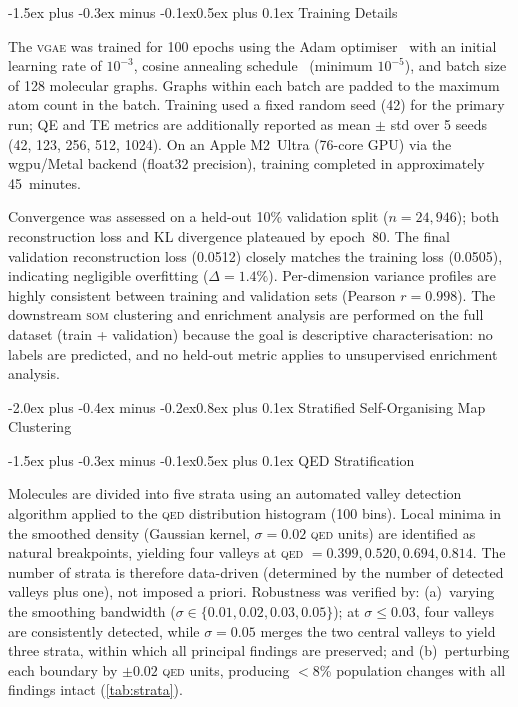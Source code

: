 \documentclass[10pt,a4paper,twocolumn]{article}
\makeatletter
\providecommand{\qed}{}
\let\qed\relax
\newcommand{\vgae}{\textsc{vgae}}
\newcommand{\som}{\textsc{som}}
\newcommand{\qedscore}{\textsc{qed}}
\let\qed\qedscore
\renewcommand\subsection{\@startsection{subsection}{2}{\z@}%
  {-2.0ex plus -0.4ex minus -0.2ex}{0.8ex plus 0.1ex}%
  {\normalfont\large\bfseries}}
\renewcommand\subsubsection{\@startsection{subsubsection}{3}{\z@}%
  {-1.5ex plus -0.3ex minus -0.1ex}{0.5ex plus 0.1ex}%
  {\normalfont\normalsize\bfseries}}
\makeatother
\begin{document}
\subsubsection{Training Details}

The \vgae{} was trained for 100 epochs using the Adam optimiser~\cite{kingma2015} with an initial learning rate of $10^{-3}$, cosine annealing schedule~\cite{loshchilov2017} (minimum $10^{-5}$), and batch size of 128 molecular graphs. Graphs within each batch are padded to the maximum atom count in the batch. Training used a fixed random seed (42) for the primary run; QE and TE metrics are additionally reported as mean $\pm$ std over 5 seeds (42, 123, 256, 512, 1024). On an Apple M2~Ultra (76-core GPU) via the wgpu/Metal backend (float32 precision), training completed in approximately 45~minutes.

Convergence was assessed on a held-out 10\% validation split ($n = 24{,}946$); both reconstruction loss and KL divergence plateaued by epoch~80. The final validation reconstruction loss (0.0512) closely matches the training loss (0.0505), indicating negligible overfitting ($\Delta = 1.4\%$). Per-dimension variance profiles are highly consistent between training and validation sets (Pearson $r = 0.998$). The downstream \som{} clustering and enrichment analysis are performed on the full dataset (train + validation) because the goal is descriptive characterisation: no labels are predicted, and no held-out metric applies to unsupervised enrichment analysis.

\subsection{Stratified Self-Organising Map Clustering}
\label{sec:som}

\subsubsection{QED Stratification}

Molecules are divided into five strata using an automated valley detection algorithm applied to the \qed{} distribution histogram (100 bins). Local minima in the smoothed density (Gaussian kernel, $\sigma = 0.02$ \qed{} units) are identified as natural breakpoints, yielding four valleys at \qed{} $= 0.399, 0.520, 0.694, 0.814$. The number of strata is therefore data-driven (determined by the number of detected valleys plus one), not imposed a priori. Robustness was verified by: (a)~varying the smoothing bandwidth ($\sigma \in \{0.01, 0.02, 0.03, 0.05\}$); at $\sigma \leq 0.03$, four valleys are consistently detected, while $\sigma = 0.05$ merges the two central valleys to yield three strata, within which all principal findings are preserved; and (b)~perturbing each boundary by $\pm 0.02$ \qed{} units, producing $<$8\% population changes with all findings intact (\cref{tab:strata}).
\end{document}
